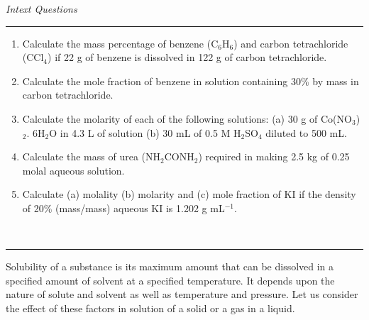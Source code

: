 \documentclass[11pt,a4paper]{article}
\begin{document}
\vspace{8pt}
\begin{tcolorbox}[enhanced,colback=white,colframe=gray!40,boxrule=0.8pt,arc=2mm,left=14pt,right=34pt,top=4pt,bottom=4pt,boxsep=0pt,width=0.94\textwidth,drop fuzzy shadow=gray!40,overlay={\fill[salmon] ([xshift=-14pt]frame.south east) rectangle (frame.north east);}]
\hfill{\large\itshape Intext Questions}\\[-4pt]
\mbox{}\hfill{\color{salmon}\rule{0.32\linewidth}{0.8pt}}
\begin{enumerate}[label=\textbf{1.\arabic*},leftmargin=30pt,itemsep=3pt,topsep=2pt]
\item Calculate the mass percentage of benzene (C$_6$H$_6$) and carbon tetrachloride (CCl$_4$) if 22 g of benzene is dissolved in 122 g of carbon tetrachloride.
\item Calculate the mole fraction of benzene in solution containing 30\% by mass in carbon tetrachloride.
\item Calculate the molarity of each of the following solutions: (a) 30 g of Co(NO$_3$)$_2$. 6H$_2$O in 4.3 L of solution (b) 30 mL of 0.5 M H$_2$SO$_4$ diluted to 500 mL.
\item Calculate the mass of urea (NH$_2$CONH$_2$) required in making 2.5 kg of 0.25 molal aqueous solution.
\item Calculate (a) molality (b) molarity and (c) mole fraction of KI if the density of 20\% (mass/mass) aqueous KI is 1.202 g mL$^{-1}$.
\end{enumerate}
\end{tcolorbox}

\vspace{4pt}
\noindent\begin{minipage}[t]{0.25\textwidth}
\vspace{0pt}
\\[-2pt]
{\color{salmon}\rule{\linewidth}{1.4pt}}
\end{minipage}\hfill
\begin{minipage}[t]{0.70\textwidth}
\vspace{0pt}
Solubility of a substance is its maximum amount that can be dissolved in a specified amount of solvent at a specified temperature. It depends upon the nature of solute and solvent as well as temperature and pressure. Let us consider the effect of these factors in solution of a solid or a gas in a liquid.
\end{minipage}
\end{document}
